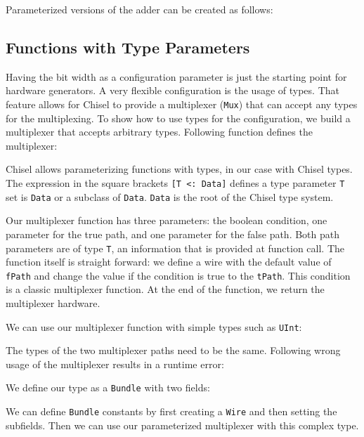 \documentclass[%
    10pt,
    headinclude, footexclude,
    openright, %
    notitlepage,
    cleardoubleempty,
    headsepline,
    pointlessnumbers,
    bibtotoc, idxtotoc,
    ]{scrbook}
\newcommand{\code}[1]{{\small{\texttt{#1}}}}
\begin{document}

\noindent Parameterized versions of the adder can be created as follows:


\subsection{Functions with Type Parameters}

Having the bit width as a configuration parameter is just the starting point for
hardware generators. A very flexible configuration is the usage of types.
That feature allows for Chisel to provide a multiplexer (\code{Mux}) that
can accept any types for the multiplexing.
To show how to use types for the configuration, we build a multiplexer
that accepts arbitrary types. Following function defines the multiplexer:


Chisel allows parameterizing functions with types, in our case with Chisel
types. The expression in the square brackets \code{[T <: Data]} defines
a type parameter \code{T} set is \code{Data} or a subclass of \code{Data}.
\code{Data} is the root of the Chisel type system.

Our multiplexer function has three parameters: the boolean condition,
one parameter for the true path, and one parameter for the false path.
Both path parameters are of type \code{T}, an information that is
provided at function call. The function itself is straight forward:
we define a wire with the default value of \code{fPath} and
change the value if the condition is true to the \code{tPath}.
This condition is a classic multiplexer function.
At the end of the function, we return the multiplexer hardware.

We can use our multiplexer function with simple types such as
\code{UInt}:


\noindent The types of the two multiplexer paths need to be the same.
Following wrong usage of the multiplexer results in a runtime error:


\noindent We define our type as a \code{Bundle} with two fields:


\noindent We can define \code{Bundle} constants by first creating
a \code{Wire} and then setting the subfields.
Then we can use our parameterized multiplexer with this complex type.
\end{document}
